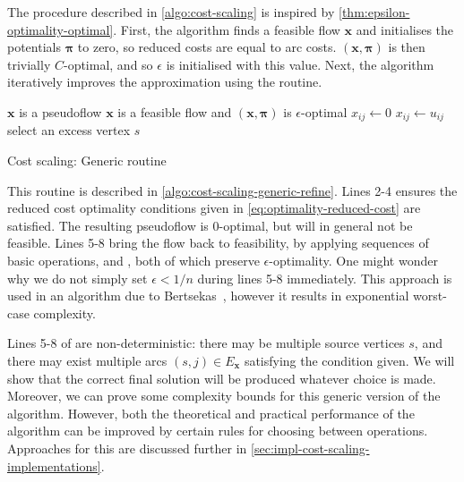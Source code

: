 The procedure described in \cref{algo:cost-scaling} is inspired by \cref{thm:epsilon-optimality-optimal}. First, the algorithm finds a feasible flow $\mathbf{x}$ and initialises the potentials $\boldsymbol{\pi}$ to zero, so reduced costs are equal to arc costs. $\left(\mathbf{x},\boldsymbol{\pi}\right)$ is then trivially $C$-optimal, and so $\epsilon$ is initialised with this value. Next, the algorithm iteratively improves the approximation using the  routine.

\begin{algorithm}
    \begin{algorithmic}[1]
        \Require $\mathbf{x}$ is a pseudoflow
        \Ensure $\mathbf{x}$ is a feasible flow and $\left(\mathbf{x},\boldsymbol{\pi}\right)$ is $\epsilon$-optimal
             
                 $x_{ij} \gets 0$ \EndIf
                 $x_{ij} \gets u_{ij}$ \EndIf
            \EndFor
             
                \State select an excess vertex $s$
                 
                \Else \enspace{}
                \EndIf
            \EndWhile
        \EndFunction
    \end{algorithmic}
    \caption{Cost scaling: Generic  routine}
    \label{algo:cost-scaling-generic-refine}
\end{algorithm}

This routine is described in \cref{algo:cost-scaling-generic-refine}. Lines 2-4 ensures the reduced cost optimality conditions given in \cref{eq:optimality-reduced-cost} are satisfied. The resulting pseudoflow is $0$-optimal, but will in general not be feasible. Lines 5-8 bring the flow back to feasibility, by applying sequences of basic operations,  and , both of which preserve $\epsilon$-optimality. One might wonder why we do not simply set $\epsilon < 1/n$ during lines 5-8 immediately. This approach is used in an algorithm due to Bertsekas~\cite{Bertsekas:1985}, however it results in exponential worst-case complexity.

Lines 5-8 of  are non-deterministic: there may be multiple source vertices $s$, and there may exist multiple arcs $(s,j) \in E_\mathbf{x}$ satisfying the condition given. We will show that the correct final solution will be produced whatever choice is made. Moreover, we can prove some complexity bounds for this generic version of the algorithm. However, both the theoretical and practical performance of the algorithm can be improved by certain rules for choosing between operations. Approaches for this are discussed further in \cref{sec:impl-cost-scaling-implementations}.

